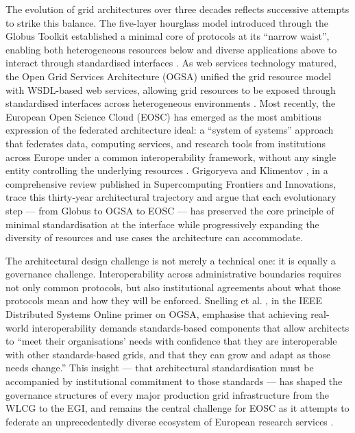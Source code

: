\documentclass[12pt,a4paper]{report}
\begin{document}
The evolution of grid architectures over three decades reflects successive attempts to strike this balance. 
The five-layer hourglass model introduced through the Globus Toolkit established a minimal core of protocols 
at its “narrow waist”, enabling both heterogeneous resources below and diverse applications above to interact 
through standardised interfaces \parencite{foster1997, foster2006}. As web services technology matured,
 the Open Grid Services Architecture (OGSA) unified the grid resource model with WSDL-based web services, 
 allowing grid resources to be exposed through standardised interfaces across heterogeneous environments 
 \parencite{foster2002, snelling2009}. Most recently, the European Open Science Cloud (EOSC) has
  emerged as the most ambitious expression of the federated architecture ideal: a “system of systems” 
  approach that federates data, computing services, and research tools from institutions across Europe 
  under a common interoperability framework, without any single entity controlling the underlying resources \parencite{eosc2022}. 
  Grigoryeva and Klimentov \parencite{grigoryeva2024}, in a comprehensive review published in Supercomputing Frontiers and Innovations, 
  trace this thirty-year architectural trajectory and argue that each evolutionary step — from Globus to OGSA to 
  EOSC — has preserved the core principle of minimal standardisation at the interface while progressively expanding
   the diversity of resources and use cases the architecture can accommodate.

The architectural design challenge is not merely a technical one: it is equally a governance challenge. 
Interoperability across administrative boundaries requires not only common protocols, but also institutional
 agreements about what those protocols mean and how they will be enforced. Snelling et al. \parencite{snelling2009}, in the
  IEEE Distributed Systems Online primer on OGSA, emphasise that achieving real-world interoperability demands
   standards-based components that allow architects to “meet their organisations’ needs with confidence that
    they are interoperable with other standards-based grids, and that they can grow and adapt as those needs 
    change.” This insight — that architectural standardisation must be accompanied by institutional commitment 
    to those standards — has shaped the governance structures of every major production grid infrastructure from 
    the WLCG to the EGI, and remains the central challenge for EOSC as it attempts to federate an unprecedentedly
     diverse ecosystem of European research services \parencite{eosc2022}.
\end{document}
